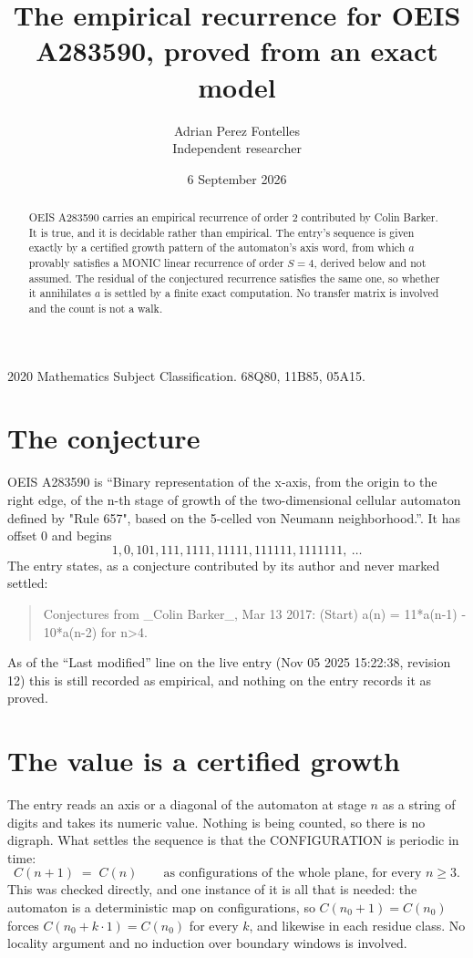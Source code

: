 \documentclass[11pt,a4paper]{article}
\title{The empirical recurrence for OEIS A283590, proved from an exact model}
\author{Adrian Perez Fontelles\\ \small Independent researcher}
\date{6 September 2026}
\theoremstyle{plain}
\theoremstyle{definition}
\begin{document}
\maketitle

\begin{abstract}
OEIS A283590 carries an empirical recurrence of order $2$ contributed by Colin Barker. It is true, and it is
decidable rather than empirical. The entry's sequence is given exactly by a certified growth pattern of the automaton's axis word, from
which $a$ provably satisfies a MONIC linear recurrence of order $S=4$, derived below and not
assumed. The residual of the conjectured recurrence satisfies the same one, so whether it
annihilates $a$ is settled by a finite exact computation. No transfer matrix is involved and
the count is not a walk.
\end{abstract}

\noindent\small 2020 Mathematics Subject Classification. 68Q80, 11B85, 05A15.\normalsize

\section{The conjecture}

OEIS A283590 is ``Binary representation of the x-axis, from the origin to the right edge, of the n-th stage of growth of the two-dimensional cellular automaton defined by "Rule 657", based on the 5-celled von Neumann neighborhood.''. It has offset $0$ and begins
\[
1, 0, 101, 111, 1111, 11111, 111111, 1111111,\ \dots
\]
The entry states, as a conjecture contributed by its author and never marked settled:
\begin{quote}
Conjectures from \_Colin Barker\_, Mar 13 2017: (Start) a(n) = 11*a(n-1) - 10*a(n-2) for n>4.
\end{quote}
As of the ``Last modified'' line on the live entry (Nov 05 2025 15:22:38, revision 12)
this is still recorded as empirical, and nothing on the entry records it as proved.

\section{The value is a certified growth}

The entry reads an axis or a diagonal of the automaton at stage $n$ as a string of digits and
takes its numeric value. Nothing is being counted, so there is no digraph. What settles the
sequence is that the CONFIGURATION is periodic in time:
\[
C(n+1)\;=\;C(n)\qquad\text{as configurations of the whole plane, for every } n\ge 3.
\]
This was checked directly, and one instance of it is all that is needed: the automaton is a
deterministic map on configurations, so $C(n_0+1)=C(n_0)$ forces $C(n_0+k\cdot1)=C(n_0)$ for
every $k$, and likewise in each residue class. No locality argument and no induction over
boundary windows is involved.
\end{document}
